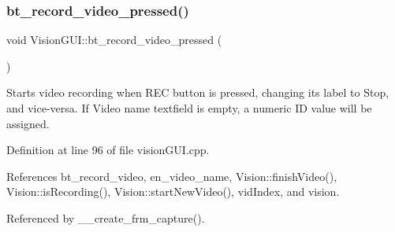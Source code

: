 \subsubsection{\texorpdfstring{bt\+\_\+record\+\_\+video\+\_\+pressed()}{bt\_record\_video\_pressed()}}
{\footnotesize\ttfamily void Vision\+G\+U\+I\+::bt\+\_\+record\+\_\+video\+\_\+pressed (\begin{DoxyParamCaption}{ }\end{DoxyParamCaption})\hspace{0.3cm}{\ttfamily [private]}}



Starts video recording when \textquotesingle{}R\+EC\textquotesingle{} button is pressed, changing its label to \textquotesingle{}Stop\textquotesingle{}, and vice-\/versa. If \textquotesingle{}Video name\textquotesingle{} textfield is empty, a numeric ID value will be assigned. 



Definition at line 96 of file vision\+G\+U\+I.\+cpp.



References bt\+\_\+record\+\_\+video, en\+\_\+video\+\_\+name, Vision\+::finish\+Video(), Vision\+::is\+Recording(), Vision\+::start\+New\+Video(), vid\+Index, and vision.



Referenced by \+\_\+\+\_\+create\+\_\+frm\+\_\+capture().


